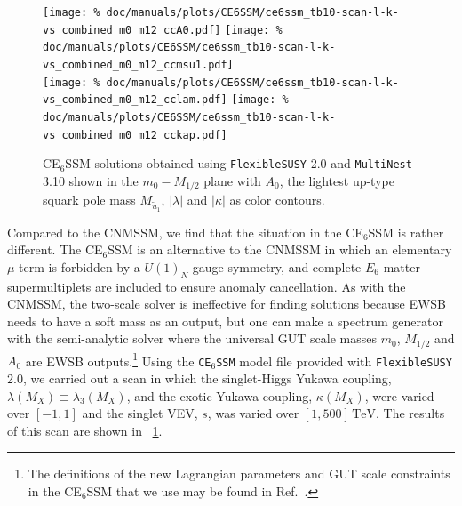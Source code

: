\documentclass[final,3p,11pt,pdflatex]{elsarticle}
\makeatletter
\newcommand{\modelname}[1]{\texttt{#1}\@\xspace}
\newcommand{\fs}{\texttt{FlexibleSUSY}\@\xspace}
\newcommand{\multinest}{\texttt{MultiNest}\@\xspace}
\newcommand{\fstwo}{\fs 2.0\@\xspace}
\newcommand{\ESSM}{E$_6$SSM\@\xspace}
\newcommand{\unit}[1]{\,\text{#1}}      %
\newcommand{\figref}[1]{\figurename~\ref{#1}}
\newcommand{\azero}{\ensuremath{A_0}\xspace}
\newcommand{\mhalf}{\ensuremath{M_{1/2}}\xspace}
\newcommand{\mzero}{\ensuremath{m_0}\xspace}
\makeatother
\begin{document}
\begin{figure}[tbh]
  \centering
  \texttt{[image: \%
    doc/manuals/plots/CE6SSM/ce6ssm\_tb10-scan-l-k-vs\_combined\_m0\_m12\_ccA0.pdf]}
   \texttt{[image: \%
    doc/manuals/plots/CE6SSM/ce6ssm\_tb10-scan-l-k-vs\_combined\_m0\_m12\_ccmsu1.pdf]} \\
  \texttt{[image: \%
    doc/manuals/plots/CE6SSM/ce6ssm\_tb10-scan-l-k-vs\_combined\_m0\_m12\_cclam.pdf]}
   \texttt{[image: \%
    doc/manuals/plots/CE6SSM/ce6ssm\_tb10-scan-l-k-vs\_combined\_m0\_m12\_cckap.pdf]}
   \caption{C\ESSM solutions obtained using \fstwo and \multinest 3.10 shown in
     the $\mzero-\mhalf$ plane with $\azero$, the lightest up-type squark pole mass
     $M_{\tilde{u}_1}$,  $|\lambda|$ and $|\kappa|$ as color contours.}
  \label{fig:ce6ssm_solutions}
\end{figure}

Compared to the CNMSSM, we find that the situation in the C\ESSM is rather
different.  The C\ESSM is an alternative to the CNMSSM in which an elementary
$\mu$ term is forbidden by a $U(1)_N$ gauge symmetry, and complete $E_6$ matter
supermultiplets are included to ensure anomaly cancellation.  As with the
CNMSSM, the two-scale solver is ineffective for finding solutions because EWSB
needs to have a soft mass as an output, but one can make a spectrum generator
with the semi-analytic solver where the universal GUT scale masses $\mzero$,
$\mhalf$ and $\azero$ are EWSB outputs.\footnote{The definitions of the
  new Lagrangian parameters and GUT scale constraints in the C\ESSM that we
  use may be found in Ref.~\cite{Athron:2009bs}.}  Using the \modelname{C\ESSM}
model file provided with \fstwo, we carried out a scan in which the
singlet-Higgs Yukawa coupling, $\lambda(M_X) \equiv \lambda_3(M_X)$, and the
exotic Yukawa coupling, $\kappa(M_X)$, were varied over $[-1,1]$ and the singlet
VEV, $s$, was varied over $[1,500] \unit{TeV}$.  The results of this scan are
shown in \figref{fig:ce6ssm_solutions}.
\end{document}
